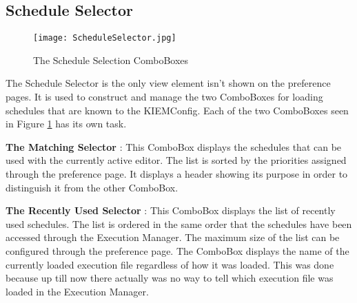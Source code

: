 \subsection{Schedule Selector}
\label{section:ScheduleSelector}
\begin{figure}[Schedule Selector]
  \centering
  \texttt{[image: ScheduleSelector.jpg]}
  \caption[The Schedule Selection ComboBoxes]%
  {The Schedule Selection ComboBoxes\protect}
  \label{fig:ScheduleSelector}
\end{figure}
The Schedule Selector is the only view element isn't shown on the preference pages. It is used
to construct and manage the two ComboBoxes for loading schedules that are known to
the \ac{KIEMConfig}. Each of the two ComboBoxes seen in Figure \ref{fig:ScheduleSelector} has its own task.
\begin{description}
 \item \textbf{The Matching Selector} : This ComboBox displays the schedules that can be used with
the currently active editor. The list is sorted by the priorities assigned through the preference page.
It displays a header showing its purpose in order to distinguish it from the other ComboBox.
 \item \textbf{The Recently Used Selector} : This ComboBox displays the list of recently used schedules.
The list is ordered in the same order that the schedules have been accessed through the Execution Manager.
The maximum size of the list can be configured through the preference page. The ComboBox displays the name
of the currently loaded execution file regardless of how it was loaded. This was done because up till now 
there actually was no way to tell which execution file was loaded in the Execution Manager.
\end{description}

